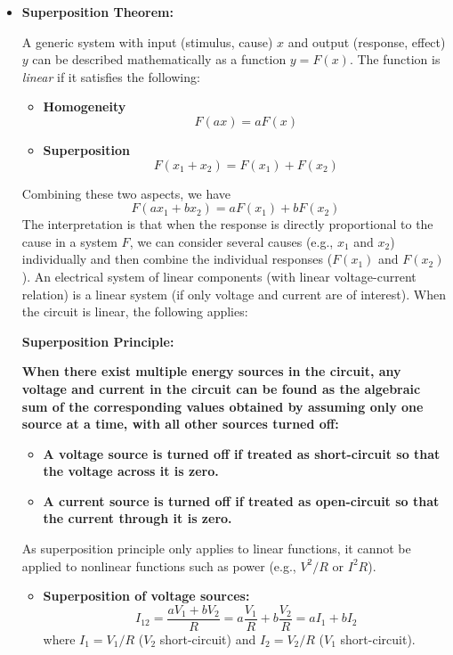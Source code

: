 \begin{itemize}
\item {\bf Superposition Theorem:}

A generic system with input (stimulus, cause) $x$ and output (response,
effect) $y$ can be described mathematically as a function $y=F(x)$. 
The function is {\em linear} if it satisfies the following:
\begin{itemize}
\item {\bf Homogeneity}
  \[
  F(ax)=aF(x) 
  \]
\item {\bf Superposition}
  \[ 
  F(x_1+x_2)=F(x_1)+F(x_2)	
  \]
\end{itemize}
Combining these two aspects, we have
\[
F(ax_1+bx_2)=aF(x_1)+bF(x_2)	
\]
The interpretation is that when the response is directly proportional to 
the cause in a system $F$, we can consider several causes (e.g., $x_1$ 
and $x_2$) individually and then combine the individual responses ($F(x_1)$ 
and $F(x_2)$). An electrical system of linear components (with linear 
voltage-current relation) is a linear system (if only voltage and current 
are of interest). When the circuit is linear, the following applies:

{\bf Superposition Principle:}

{\bf When there exist multiple energy sources in the circuit, any voltage 
  and current in the circuit can be found as the algebraic sum of the 
  corresponding values obtained by assuming only one source at a time,
  with all other sources turned off:}
\begin{itemize}
\item {\bf A voltage source is turned off if treated as short-circuit so that 
  the voltage across it is zero.}
\item {\bf A current source is turned off if treated as open-circuit so that 
  the current through it is zero.}
\end{itemize}

As superposition principle only applies to linear functions, it cannot be
applied to nonlinear functions such as power (e.g., $V^2/R$ or $I^2R$). 


\begin{itemize}
\item {\bf Superposition of voltage sources:}
  \[	I_{12}=\frac{aV_1+bV_2}{R}=a\frac{V_1}{R}+b\frac{V_2}{R}=aI_1+bI_2 \]
  where $I_1=V_1/R$ ($V_2$ short-circuit) and $I_2=V_2/R$ ($V_1$ short-circuit).


\end{itemize}
\end{itemize}
